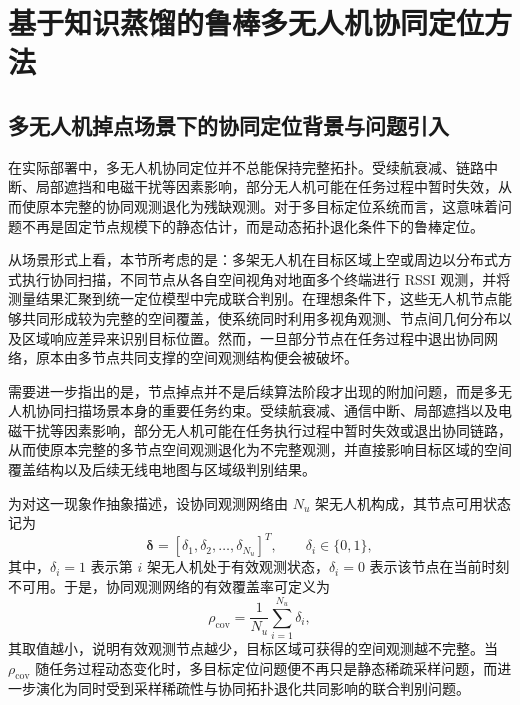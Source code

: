 \section{基于知识蒸馏的鲁棒多无人机协同定位方法}
\label{sec:4_4}

\subsection{多无人机掉点场景下的协同定位背景与问题引入}
\label{subsec:4_3_1}

在实际部署中，多无人机协同定位并不总能保持完整拓扑。受续航衰减、链路中断、局部遮挡和电磁干扰等因素影响，部分无人机可能在任务过程中暂时失效，从而使原本完整的协同观测退化为残缺观测。对于多目标定位系统而言，这意味着问题不再是固定节点规模下的静态估计，而是动态拓扑退化条件下的鲁棒定位。

从场景形式上看，本节所考虑的是：多架无人机在目标区域上空或周边以分布式方式执行协同扫描，不同节点从各自空间视角对地面多个终端进行 RSSI 观测，并将测量结果汇聚到统一定位模型中完成联合判别。在理想条件下，这些无人机节点能够共同形成较为完整的空间覆盖，使系统同时利用多视角观测、节点间几何分布以及区域响应差异来识别目标位置。然而，一旦部分节点在任务过程中退出协同网络，原本由多节点共同支撑的空间观测结构便会被破坏。

需要进一步指出的是，节点掉点并不是后续算法阶段才出现的附加问题，而是多无人机协同扫描场景本身的重要任务约束。受续航衰减、通信中断、局部遮挡以及电磁干扰等因素影响，部分无人机可能在任务执行过程中暂时失效或退出协同链路，从而使原本完整的多节点空间观测退化为不完整观测，并直接影响目标区域的空间覆盖结构以及后续无线电地图与区域级判别结果。

为对这一现象作抽象描述，设协同观测网络由 \(N_u\) 架无人机构成，其节点可用状态记为
\begin{equation}
\boldsymbol{\delta}
=
[\delta_1,\delta_2,\ldots,\delta_{N_u}]^{T},
\qquad
\delta_i\in\{0,1\},
\label{eq:4_2_uav_availability_vector}
\end{equation}
其中，\(\delta_i=1\) 表示第 \(i\) 架无人机处于有效观测状态，\(\delta_i=0\) 表示该节点在当前时刻不可用。于是，协同观测网络的有效覆盖率可定义为
\begin{equation}
\rho_{\mathrm{cov}}
=
\frac{1}{N_u}\sum_{i=1}^{N_u}\delta_i,
\label{eq:4_3_effective_coverage_ratio}
\end{equation}
其取值越小，说明有效观测节点越少，目标区域可获得的空间观测越不完整。当 \(\rho_{\mathrm{cov}}\) 随任务过程动态变化时，多目标定位问题便不再只是静态稀疏采样问题，而进一步演化为同时受到采样稀疏性与协同拓扑退化共同影响的联合判别问题。

